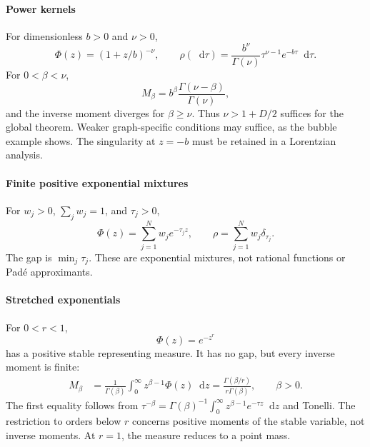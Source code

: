 \documentclass[final,5p,times,twocolumn,numbers,nopreprintline]{elsarticle}
\numberwithin{equation}{section}
\theoremstyle{definition}
\theoremstyle{remark}
\newcommand{\dd}{\mathop{}\!\mathrm d}
\newcommand{\Ph}{\Phi}
\begin{document}
\paragraph{Power kernels}
For dimensionless \(b>0\) and \(\nu>0\),
\begin{equation}
 \Ph(z)=(1+z/b)^{-\nu},\qquad
 \rho(\dd\tau)=\frac{b^\nu}{\Gamma(\nu)}
                 \tau^{\nu-1}e^{-b\tau}\dd\tau .
 \label{eq:power-family}
\end{equation}
For \(0<\beta<\nu\),
\begin{equation}
 M_\beta=b^\beta\frac{\Gamma(\nu-\beta)}{\Gamma(\nu)},
 \label{eq:gamma-inverse-moments}
\end{equation}
and the inverse moment diverges for \(\beta\geq\nu\).
Thus \(\nu>1+D/2\) suffices for the global theorem.
Weaker graph-specific conditions may suffice, as the bubble
example shows. The singularity at \(z=-b\) must be retained in a
Lorentzian analysis.

\paragraph{Finite positive exponential mixtures}
For \(w_j>0\), \(\sum_jw_j=1\), and \(\tau_j>0\),
\begin{equation}
 \Ph(z)=\sum_{j=1}^Nw_je^{-\tau_jz},\qquad
 \rho=\sum_{j=1}^Nw_j\delta_{\tau_j}.
 \label{eq:finite-mixture}
\end{equation}
The gap is \(\min_j\tau_j\). These are exponential mixtures,
not rational functions or Pad\'e approximants.

\paragraph{Stretched exponentials}
For \(0<r<1\),
\begin{equation}
 \Ph(z)=e^{-z^r}
 \label{eq:stable-family}
\end{equation}
has a positive stable representing measure. It has no gap, but
every inverse moment is finite:
\begin{align}
 M_\beta
 &=\frac1{\Gamma(\beta)}
     \int_0^\infty z^{\beta-1}\Ph(z)\dd z
   =\frac{\Gamma(\beta/r)}{r\Gamma(\beta)},
 \qquad \beta>0.
 \label{eq:stable-inverse-moments}
\end{align}
The first equality follows from
\(\tau^{-\beta}
 =\Gamma(\beta)^{-1}\int_0^\infty z^{\beta-1}e^{-\tau z}\dd z\)
and Tonelli. The restriction to orders below \(r\) concerns
positive moments of the stable variable, not inverse moments.
At \(r=1\), the measure reduces to a point mass.
\end{document}
